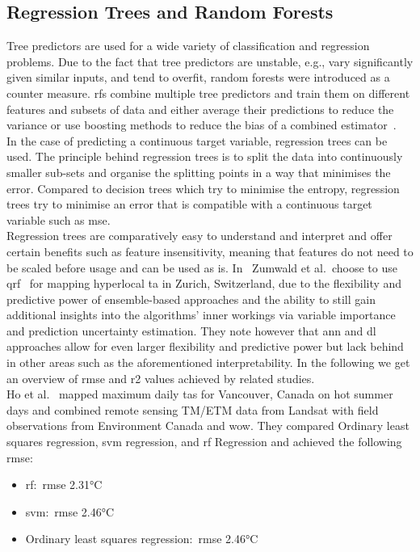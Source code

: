 \subsection{Regression Trees and Random Forests}

Tree predictors are used for a wide variety of classification and regression problems. Due to the fact that tree predictors are unstable, e.g., vary significantly given similar inputs, and tend to overfit, random forests were introduced as a counter measure. \gls{rf}s combine multiple tree predictors and train them on different features and subsets of data and either average their predictions to reduce the variance or use boosting methods to reduce the bias of a combined estimator~\cite{breiman2001random}.\\
In the case of predicting a continuous target variable, regression trees can be used. The principle behind regression trees is to split the data into continuously smaller sub-sets and organise the splitting points in a way that minimises the error. Compared to decision trees which try to minimise the entropy, regression trees try to minimise an error that is compatible with a continuous target variable such as \gls{mse}.\\
Regression trees are comparatively easy to understand and interpret and offer certain benefits such as feature insensitivity, meaning that features do not need to be scaled before usage and can be used as is. In~\cite{zumwald2021mapping} Zumwald et al.\ choose to use \gls{qrf}~\cite{meinshausen2006quantile} for mapping hyperlocal \gls{ta} in Zurich, Switzerland, due to the flexibility and predictive power of ensemble-based approaches and the ability to still gain additional insights into the algorithms' inner workings via variable importance and prediction uncertainty estimation. They note however that \gls{ann} and \gls{dl} approaches allow for even larger flexibility and predictive power but lack behind in other areas such as the aforementioned interpretability. In the following we get an overview of \gls{rmse} and \gls{r2} values achieved by related studies.\\
Ho et al.~\cite{ho2014mapping} mapped maximum daily \gls{ta}s for Vancouver, Canada on hot summer days and combined remote sensing TM/ETM data from Landsat with field observations from Environment Canada and \gls{wow}. They compared Ordinary least squares regression, \gls{svm} regression, and \gls{rf} Regression and achieved the following \gls{rmse}:

\begin{itemize}
    \item \gls{rf}:\ \gls{rmse} 2.31°C
    \item \gls{svm}:\ \gls{rmse} 2.46°C
    \item Ordinary least squares regression:\ \gls{rmse} 2.46°C
\end{itemize}


